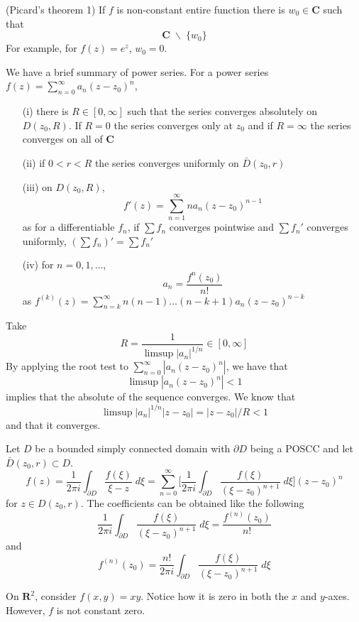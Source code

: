\begin{thm}
(Picard's theorem 1) If $f$ is non-constant entire function there is $w_0\in {\bm C}$ such that 
\[{\bm C}\;\backslash\;\{w_0\}\]
For example, for $f(z)=e^{z}$, $w_0=0$. 
\end{thm}
\vspace{2ex}
\begin{rmk}
We have a brief summary of power series. For a power series $f(z)=\sum ^{\infty }_{n=0}a_{n}(z-z_0)^{n}$,
\begin{itemize}
\item[(i)] there is $R\in [0,\infty ]$ such that the series converges absolutely on $D(z_0,R)$. If $R=0$ the series converges only at $z_0$ and if $R=\infty $ the series converges on all of ${\bm C}$
\item[(ii)] if $0<r<R$ the series converges uniformly on $\bar{D}(z_0,r)$
\item[(iii)] on $D(z_0,R)$,
\[f'(z)=\sum ^{\infty }_{n=1}na_{n}(z-z_0)^{n-1}\] 
as for a differentiable $f_{n}$, if $\sum f_{n}$ converges pointwise and $\sum f_{n}'$ converges uniformly, $(\sum f_{n})'=\sum f_{n}'$
\item[(iv)] for $n=0,1,\ldots $,
\[a_{n}=\dfrac{f^{n}(z_0)}{n!}\]
as $f^{(k)}(z)=\sum ^{\infty }_{n=k}n(n-1)\ldots (n-k+1)a_{n}(z-z_0)^{n-k}$
\end{itemize}
Take
\[R=\dfrac{1}{\limsup |a_{n}|^{1/n}}\in [0,\infty] \]
By applying the root test to $\sum ^{\infty }_{n=0}|a_{n}(z-z_0)^{n}|$, we have that
\[\limsup|a_{n}(z-z_0)^{n}|<1\]
implies that the absolute of the sequence converges. We know that
\[\limsup |a_{n}|^{1/n}|z-z_0|=|z-z_0|/R<1\]
and that it converges.
\end{rmk}
\vspace{2ex}
\begin{recall}
Let $D$ be a bounded simply connected domain with $\partial D$ being a POSCC and let $\bar{D}(z_0,r)\subset D$.
\[f(z)=\dfrac{1}{2\pi i}\int _{\partial D}\dfrac{f(\xi )}{\xi -z}\;d\xi =\sum ^{\infty }_{n=0}\Big[\dfrac{1}{2\pi i}\int _{\partial D}\dfrac{f(\xi )}{(\xi -z_0)^{n+1}}\;d\xi \Big](z-z_0)^{n}\]
for $z\in D(z_0,r)$. The coefficients can be obtained like the following
\[\dfrac{1}{2\pi i}\int _{\partial D}\dfrac{f(\xi )}{(\xi -z_0)^{n+1}}\;d\xi =\dfrac{f^{(n)}(z_0)}{n!}\]
and
\[f^{(n)}(z_0)=\dfrac{n!}{2\pi i}\int _{\partial D}\dfrac{f(\xi )}{(\xi -z_0)^{n+1}}\;d\xi \]
\end{recall}
\vspace{2ex}
\begin{ex}
On ${\bm R}^{2}$, consider $f(x,y)=xy$. Notice how it is zero in both the $x$ and $y$-axes. However, $f$ is not constant zero. 
\end{ex}
